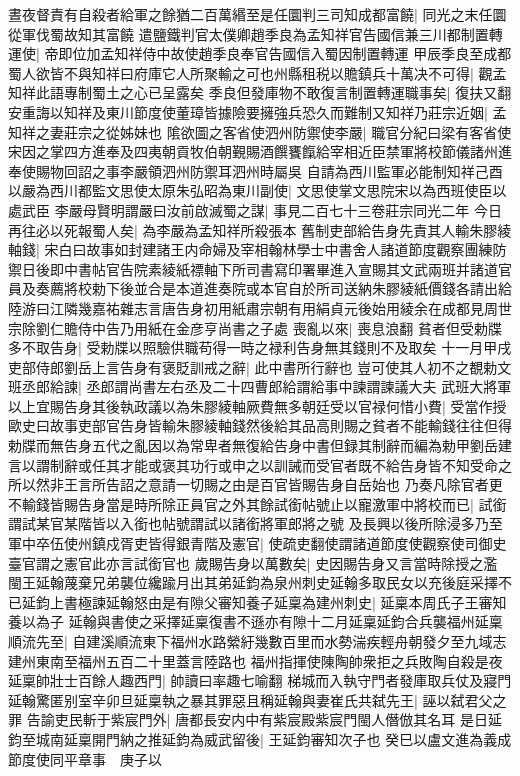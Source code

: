 晝夜督責有自殺者給軍之餘猶二百萬緡至是任圜判三司知成都富饒|{
	同光之末任圜從軍伐蜀故知其富饒}
遣鹽鐵判官太僕卿趙季良為孟知祥官告國信兼三川都制置轉運使|{
	帝即位加孟知祥侍中故使趙季良奉官告國信入蜀因制置轉運}
甲辰季良至成都蜀人欲皆不與知祥曰府庫它人所聚輸之可也州縣租税以贍鎮兵十萬决不可得|{
	觀孟知祥此語專制蜀土之心已呈露矣}
季良但發庫物不敢復言制置轉運職事矣|{
	復扶又翻}
安重誨以知祥及東川節度使董璋皆據險要擁強兵恐久而難制又知祥乃莊宗近姻|{
	孟知祥之妻莊宗之從姊妹也}
隂欲圖之客省使泗州防禦使李嚴|{
	職官分紀曰梁有客省使宋因之掌四方進奉及四夷朝貢牧伯朝覲賜酒饌饔餼給宰相近臣禁軍將校節儀諸州進奉使賜物回詔之事李嚴領泗州防禦耳泗州時屬吳}
自請為西川監軍必能制知祥己酉以嚴為西川都監文思使太原朱弘昭為東川副使|{
	文思使掌文思院宋以為西班使臣以處武臣}
李嚴母賢明謂嚴曰汝前啟滅蜀之謀|{
	事見二百七十三卷莊宗同光二年}
今日再往必以死報蜀人矣|{
	為李嚴為孟知祥所殺張本}
舊制吏部給告身先責其人輸朱膠綾軸錢|{
	宋白曰故事如封建諸王内命婦及宰相翰林學士中書舍人諸道節度觀察團練防禦日後即中書帖官告院素綾紙褾軸下所司書寫印署畢進入宣賜其文武兩班并諸道官員及奏薦將校勅下後並合是本道進奏院或本官自於所司送納朱膠綾紙價錢各請出給陸游曰江隣幾嘉祐雜志言唐告身初用紙肅宗朝有用絹貞元後始用綾余在成都見周世宗除劉仁贍侍中告乃用紙在金彦亨尚書之子處}
喪亂以來|{
	喪息浪翻}
貧者但受勅牒多不取告身|{
	受勅牒以照驗供職苟得一時之禄利告身無其錢則不及取矣}
十一月甲戌吏部侍郎劉岳上言告身有褒貶訓戒之辭|{
	此中書所行辭也}
豈可使其人初不之覩勅文班丞郎給諫|{
	丞郎謂尚書左右丞及二十四曹郎給謂給事中諫謂諫議大夫}
武班大將軍以上宜賜告身其後執政議以為朱膠綾軸厥費無多朝廷受以官禄何惜小費|{
	受當作授歐史曰故事吏部官告身皆輸朱膠綾軸錢然後給其品高則賜之貧者不能輸錢往往但得勅牒而無告身五代之亂因以為常卑者無復給告身中書但録其制辭而編為勅甲劉岳建言以謂制辭或任其才能或褒其功行或申之以訓誡而受官者既不給告身皆不知受命之所以然非王言所告詔之意請一切賜之由是百官皆賜告身自岳始也}
乃奏凡除官者更不輸錢皆賜告身當是時所除正員官之外其餘試銜帖號止以寵激軍中將校而已|{
	試銜謂試某官某階皆以入銜也帖號謂試以諸銜將軍郎將之號}
及長興以後所除浸多乃至軍中卒伍使州鎮戍胥吏皆得銀青階及憲官|{
	使疏吏翻使謂諸道節度使觀察使司御史臺官謂之憲官此亦言試銜官也}
歲賜告身以萬數矣|{
	史因賜告身又言當時除授之濫}
閩王延翰蔑棄兄弟襲位纔踰月出其弟延鈞為泉州刺史延翰多取民女以充後庭采擇不已延鈞上書極諫延翰怒由是有隙父審知養子延稟為建州刺史|{
	延稟本周氏子王審知養以為子}
延翰與書使之采擇延稟復書不遜亦有隙十二月延稟延鈞合兵襲福州延稟順流先至|{
	自建溪順流東下福州水路縈紆幾數百里而水勢湍疾輕舟朝發夕至九域志建州東南至福州五百二十里蓋言陸路也}
福州指揮使陳陶帥衆拒之兵敗陶自殺是夜延稟帥壯士百餘人趣西門|{
	帥讀曰率趣七喻翻}
梯城而入執守門者發庫取兵仗及寢門延翰驚匿别室辛卯旦延稟執之暴其罪惡且稱延翰與妻崔氏共弑先王|{
	誣以弑君父之罪}
告諭吏民斬于紫宸門外|{
	唐都長安内中有紫宸殿紫宸門閩人僭倣其名耳}
是日延鈞至城南延稟開門納之推延鈞為威武留後|{
	王延鈞審知次子也}
癸巳以盧文進為義成節度使同平章事　庚子以

